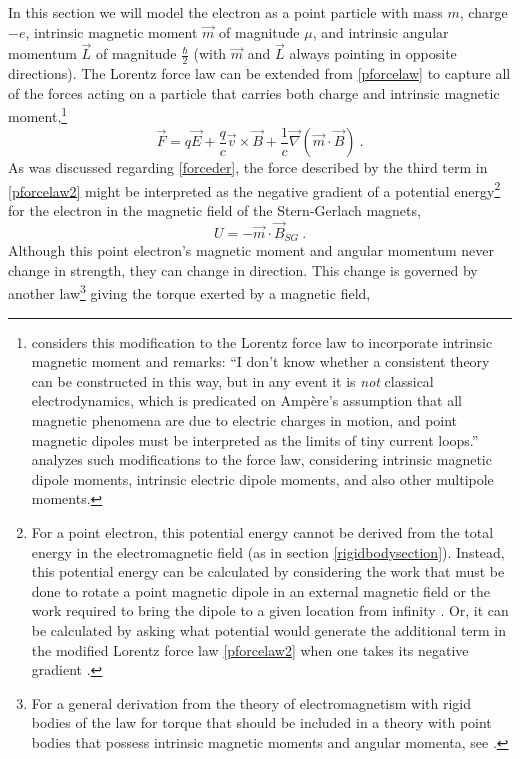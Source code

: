 \documentclass[onecolumn,secnumarabic,amsmath,amssymb,balancelastpage,nofootinbib]{article}
\begin{document}
In this section we will model the electron as a point particle with mass $m$, charge $-e$, intrinsic magnetic moment $\vec{m}$ of magnitude $\mu$, and intrinsic angular momentum $\vec{L}$ of magnitude $\frac{\hbar}{2}$ (with $\vec{m}$ and $\vec{L}$ always pointing in opposite directions).  The Lorentz force law can be extended from \eqref{pforcelaw} to capture all of the forces acting on a particle that carries both charge and intrinsic magnetic moment,\footnote{\citet[pg.\ 378]{griffiths} considers this modification to the Lorentz force law to incorporate intrinsic magnetic moment and remarks: ``I don't know whether a consistent theory can be constructed in this way, but in any event it is \emph{not} classical electrodynamics, which is predicated on Amp\`{e}re's assumption that all magnetic phenomena are due to electric charges in motion, and point magnetic dipoles must be interpreted as the limits of tiny current loops.''  \citet{barandes2019long, barandes2019short} analyzes such modifications to the force law, considering intrinsic magnetic dipole moments, intrinsic electric dipole moments, and also other multipole moments.\label{modifiedforcefootnote}}
\begin{equation}
\vec{F}= q  \vec{E} + \frac{q}{c} \vec{v} \times \vec{B} + \frac{1}{c}\vec{\nabla} \left(\vec{m}\cdot\vec{B} \right)
\ .
\label{pforcelaw2}
\end{equation}
As was discussed regarding \eqref{forceder}, the force described by the third term in \eqref{pforcelaw2} might be interpreted as the negative gradient of a potential energy\footnote{For a point electron, this potential energy cannot be derived from the total energy in the electromagnetic field (as in section \ref{rigidbodysection}).  Instead, this potential energy can be calculated by considering the work that must be done to rotate a point magnetic dipole in an external magnetic field \citep[problem 6.21]{griffiths} or the work required to bring the dipole to a given location from infinity \citep[pg.\ 227]{goodnelson1971}.  Or, it can be calculated by asking what potential would generate the additional term in the modified Lorentz force law \eqref{pforcelaw2} when one takes its negative gradient \citep[sec.\ 5.7]{jackson}.} for the electron in the magnetic field of the Stern-Gerlach magnets,
\begin{equation}
U=- \vec{m} \cdot \vec{B}_{SG}
\ .
\label{penergy}
\end{equation}
Although this point electron's magnetic moment and angular momentum never change in strength, they can change in direction.  This change is governed by another law\footnote{For a general derivation from the theory of electromagnetism with rigid bodies of the law for torque that should be included in a theory with point bodies that possess intrinsic magnetic moments and angular momenta, see \citet[sec.\ 5.7]{jackson}.} giving the torque exerted by a magnetic field,
\end{document}
